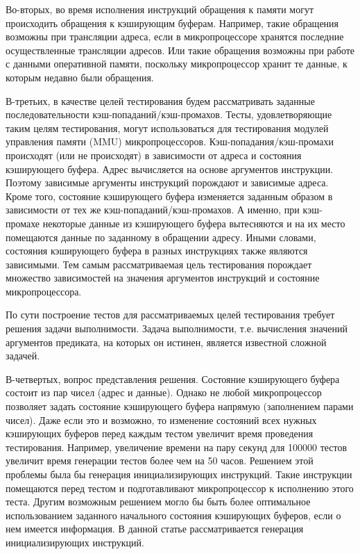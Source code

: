 Во-вторых, во время исполнения инструкций обращения к памяти могут
происходить обращения к кэширующим буферам. Например, такие
обращения возможны при трансляции адреса, если в микропроцессоре
хранятся последние осуществленные трансляции адресов. Или такие
обращения возможны при работе с данными оперативной памяти,
поскольку микропроцессор хранит те данные, к которым недавно были
обращения.

В-третьих, в качестве целей тестирования будем рассматривать
заданные последовательности кэш-попаданий/кэш-промахов. Тесты,
удовлетворяющие таким целям тестирования, могут использоваться для
тестирования модулей управления памяти (MMU) микропроцессоров.
Кэш-попадания/кэш-промахи происходят (или не происходят) в
зависимости от адреса и состояния кэширующего буфера. Адрес
вычисляется на основе аргументов инструкции. Поэтому зависимые
аргументы инструкций порождают и зависимые адреса. Кроме того,
состояние кэширующего буфера изменяется заданным образом в
зависимости от тех же кэш-попаданий/кэш-промахов. А именно, при
кэш-промахе некоторые данные из кэширующего буфера вытесняются и на
их место помещаются данные по заданному в обращении адресу. Иными
словами, состояния кэширующего буфера в разных инструкциях также
являются зависимыми. Тем самым рассматриваемая цель тестирования
порождает множество зависимостей на значения аргументов инструкций и
состояние микропроцессора.

По сути построение тестов для рассматриваемых целей тестирования
требует решения задачи выполнимости. Задача выполнимости, т.е.
вычисления значений аргументов предиката, на которых он истинен,
является известной сложной задачей.

В-четвертых, вопрос представления решения. Состояние кэширующего
буфера состоит из пар чисел (адрес и данные). Однако не любой
микропроцессор позволяет задать состояние кэширующего буфера
напрямую (заполнением парами чисел). Даже если это и возможно, то
изменение состояний всех нужных кэширующих буферов перед каждым
тестом увеличит время проведения тестирования. Например, увеличение
времени на пару секунд для 100000 тестов увеличит время генерации
тестов более чем на 50 часов. Решением этой проблемы была бы
генерация инициализирующих инструкций. Такие инструкции помещаются
перед тестом и подготавливают микропроцессор к исполнению этого
теста. Другим возможным решением могло бы быть более оптимальное
использованием заданного начального состояния кэширующих буферов,
если о нем имеется информация. В данной статье рассматривается
генерация инициализирующих инструкций.



